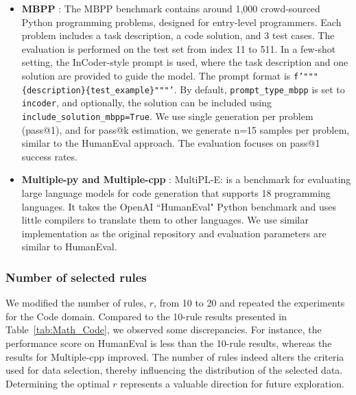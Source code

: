 \documentclass{article}
\begin{document}
\begin{itemize}
    \item \textbf{MBPP} \citep{austin2021program}: The MBPP benchmark contains around 1,000 crowd-sourced Python programming problems, designed for entry-level programmers. Each problem includes a task description, a code solution, and 3 test cases. The evaluation is performed on the test set from index 11 to 511. In a few-shot setting, the InCoder-style prompt is used, where the task description and one solution are provided to guide the model. The prompt format is \texttt{f'"""\{description\}\{test\_example\}"""'}. By default, \texttt{prompt\_type\_mbpp} is set to \texttt{incoder}, and optionally, the solution can be included using \texttt{include\_solution\_mbpp=True}. We use single generation per problem (pass@1), and for pass@k estimation, we generate n=15 samples per problem, similar to the HumanEval approach. The evaluation focuses on pass@1 success rates.

  \item \textbf{Multiple-py and Multiple-cpp} \citep{cassano2022multipl}: 
MultiPL-E: is a benchmark for evaluating large language models for code generation that supports 18 programming languages. It takes the OpenAI ``HumanEval" Python benchmark and uses little compilers to translate them to other languages. We use similar implementation as the original repository and evaluation parameters are similar to HumanEval.
\end{itemize}




\subsubsection{Number of selected rules}\label{Appendix-EvalB-20rules}
We modified the number of rules, $r$, from 10 to 20 and repeated the experiments for the Code domain. Compared to the 10-rule results presented in Table~\ref{tab:Math_Code}, we observed some discrepancies. For instance, the performance score on HumanEval is less than the 10-rule results, whereas the results for Multiple-cpp improved. The number of rules indeed alters the criteria used for data selection, thereby influencing the distribution of the selected data. Determining the optimal $r$ represents a valuable direction for future exploration.
\end{document}
